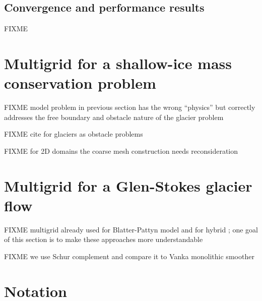 \documentclass[letterpaper,final,12pt,reqno]{amsart}
\numberwithin{equation}{section}
\numberwithin{figure}{section}
\numberwithin{table}{section}
\begin{document}
\subsection*{Convergence and performance results} FIXME


\section{Multigrid for a shallow-ice mass conservation problem} \label{sec:sia}

FIXME model problem in previous section has the wrong ``physics'' but correctly addresses the free boundary and obstacle nature of the glacier problem

FIXME cite for glaciers as obstacle problems \cite{Bueler2016,Bueler2020,Calvoetal2002,JouvetBueler2012}

FIXME for 2D domains the coarse mesh construction needs reconsideration


\section{Multigrid for a Glen-Stokes glacier flow} \label{sec:stokes}

FIXME multigrid already used for Blatter-Pattyn model \cite{BrownSmithAhmadia2013} and for hybrid \cite{Jouvetetal2013}; one goal of this section is to make these approaches more understandable

FIXME we use Schur complement \cite{Bueler2021,Elmanetal2014} and compare it to Vanka monolithic smoother \cite{Farrelletal2019}

\small

\bigskip



\normalsize

\appendix
\section{Notation}
\end{document}
